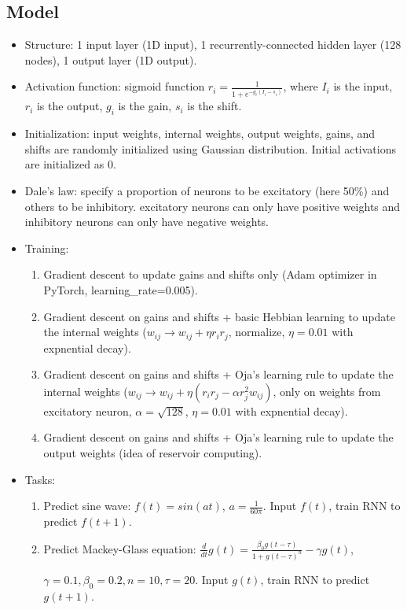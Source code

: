 \documentclass[12pt, a4paper]{article}
\begin{document}
\subsection*{Model}
\begin{itemize}
    \item Structure: 1 input layer (1D input), 1 recurrently-connected hidden layer (128 nodes), 1 output layer (1D output).
    \item Activation function: sigmoid function $r_i = \frac{1}{1 + e^{-g_i(I_i-s_i)}}$, where $I_i$ is the input, $r_i$ is the output, $g_i$ is the gain, $s_i$ is the shift. 
    \item Initialization: input weights, internal weights, output weights, gains, and shifts are randomly initialized using Gaussian distribution. Initial activations are initialized as 0.
    \item Dale's law: specify a proportion of neurons to be excitatory (here 50\%) and others to be inhibitory. excitatory neurons can only have positive weights and inhibitory neurons can only have negative weights.
    \item Training: 
    \begin{enumerate}
        \item Gradient descent to update gains and shifts only (Adam optimizer in PyTorch, learning\_rate=0.005).
        \item Gradient descent on gains and shifts + basic Hebbian learning to update the internal weights ($w_{ij} \rightarrow w_{ij} + \eta r_i r_j$, normalize, $\eta=0.01$ with expnential decay).
        \item Gradient descent on gains and shifts + Oja's learning rule to update the internal weights ($w_{ij} \rightarrow w_{ij} + \eta (r_i r_j - \alpha r_j^2 w_{ij})$, only on weights from excitatory neuron, $\alpha = \sqrt{128}$, $\eta=0.01$ with expnential decay).
        \item Gradient descent on gains and shifts + Oja's learning rule to update the output weights (idea of reservoir computing).
    \end{enumerate}
    \item Tasks:
    \begin{enumerate}
        \item Predict sine wave: $f(t)=sin(at)$, $a=\frac{1}{60\pi}$. Input $f(t)$, train RNN to predict $f(t+1)$.
        \item Predict Mackey-Glass equation: $\frac{d}{dt}g(t)=\frac{\beta_0 g(t-\tau)}{1+g(t-\tau)^n}-\gamma g(t)$, 
        
        $\gamma=0.1, \beta_0=0.2, n=10, \tau=20$. Input $g(t)$, train RNN to predict $g(t+1)$.
    \end{enumerate}

\end{itemize}
\end{document}
